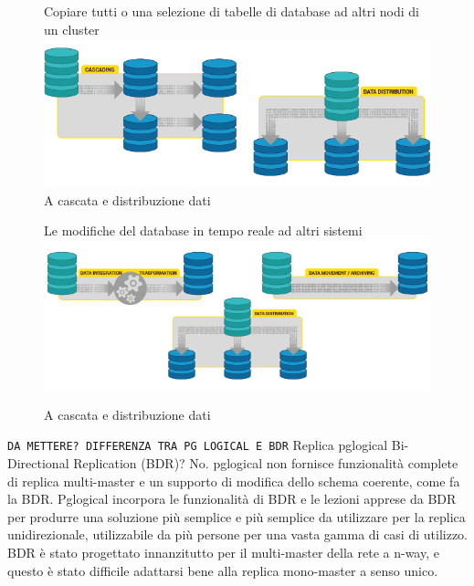 \begin{figure}[htbp]
\centering
Copiare tutti o una selezione di tabelle di database ad altri nodi di un cluster
\includegraphics[scale=0.70]{img/pglogical_3.png}\\
\caption{A cascata e distribuzione dati \label{figura3} \cite{etichetta4}}
Le modifiche del database in tempo reale ad altri sistemi
\includegraphics[scale=0.70]{img/pglogical_4.png}\\
\caption{A cascata e distribuzione dati \label{figura4} \cite{etichetta4}}
\end{figure}

\texttt{DA METTERE? DIFFERENZA TRA PG LOGICAL E BDR}
Replica pglogical Bi-Directional Replication (BDR)?
No. pglogical non fornisce funzionalità complete di replica multi-master e un supporto di modifica dello schema coerente, come fa la BDR. Pglogical incorpora le funzionalità di BDR e le lezioni apprese da BDR per produrre una soluzione più semplice e più semplice da utilizzare per la replica unidirezionale, utilizzabile da più persone per una vasta gamma di casi di utilizzo. BDR è stato progettato innanzitutto per il multi-master della rete a n-way, e questo è stato difficile adattarsi bene alla replica mono-master a senso unico.
%
